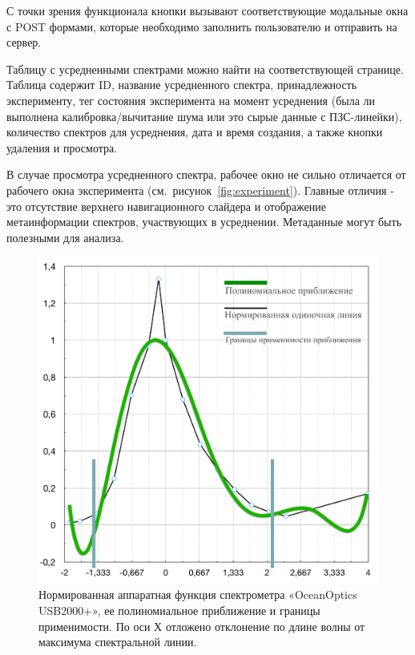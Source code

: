 С точки зрения функционала кнопки вызывают соответствующие модальные окна с POST формами, которые необходимо заполнить
пользователю и отправить на сервер.

Таблицу с усредненными спектрами можно найти на соответствующей странице. Таблица содержит ID, название усредненного
спектра, принадлежность эксперименту, тег состояния эксперимента на момент усреднения
(была ли выполнена калибровка/вычитание шума или это сырые данные с ПЗС-линейки), количество спектров для усреднения,
дата и время создания, а также кнопки удаления и просмотра.

В случае просмотра усредненного спектра, рабочее окно не сильно отличается от рабочего окна эксперимента (см.~рисунок~\ref{fig:experiment}).
Главные отличия - это отсутствие верхнего навигационного слайдера и отображение метаинформации спектров, участвующих
в усреднении. Метаданные могут быть полезными для анализа.

\begin{figure}[t]
  \centering
  \includegraphics[width=13cm]{figures/hardware_function}
  \caption{Нормированная аппаратная функция спектрометра «OceanOptics USB2000+», ее полиномиальное приближение и границы применимости.
  По оси Х отложено отклонение по длине волны от максимума спектральной линии.
   }
  \label{fig:hardware_function}
\end{figure}

